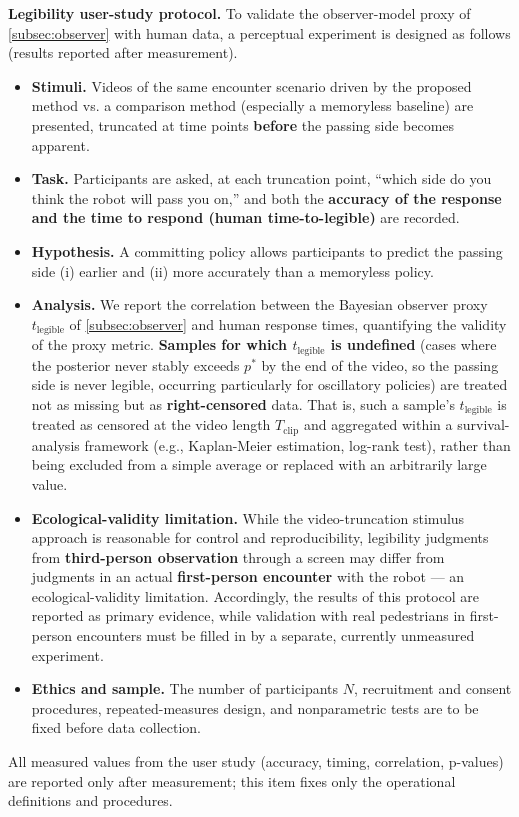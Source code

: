 \noindent\textbf{Legibility user-study protocol.} To validate the observer-model proxy of \cref{subsec:observer} with human data, a perceptual experiment is designed as follows (results reported after measurement).

\begin{itemize}
\item \textbf{Stimuli.} Videos of the same encounter scenario driven by the proposed method vs. a comparison method (especially a memoryless baseline) are presented, truncated at time points \textbf{before} the passing side becomes apparent.
\item \textbf{Task.} Participants are asked, at each truncation point, ``which side do you think the robot will pass you on,'' and both the \textbf{accuracy of the response and the time to respond (human time-to-legible)} are recorded.
\item \textbf{Hypothesis.} A committing policy allows participants to predict the passing side (i) earlier and (ii) more accurately than a memoryless policy.
\item \textbf{Analysis.} We report the correlation between the Bayesian observer proxy $t_{\text{legible}}$ of \cref{subsec:observer} and human response times, quantifying the validity of the proxy metric. \textbf{Samples for which $t_{\text{legible}}$ is undefined} (cases where the posterior never stably exceeds $p^*$ by the end of the video, so the passing side is never legible, occurring particularly for oscillatory policies) are treated not as missing but as \textbf{right-censored} data. That is, such a sample's $t_{\text{legible}}$ is treated as censored at the video length $T_{\text{clip}}$ and aggregated within a survival-analysis framework (e.g., Kaplan-Meier estimation, log-rank test), rather than being excluded from a simple average or replaced with an arbitrarily large value.
\item \textbf{Ecological-validity limitation.} While the video-truncation stimulus approach is reasonable for control and reproducibility, legibility judgments from \textbf{third-person observation} through a screen may differ from judgments in an actual \textbf{first-person encounter} with the robot --- an ecological-validity limitation. Accordingly, the results of this protocol are reported as primary evidence, while validation with real pedestrians in first-person encounters must be filled in by a separate, currently unmeasured experiment.
\item \textbf{Ethics and sample.} The number of participants $N$, recruitment and consent procedures, repeated-measures design, and nonparametric tests are to be fixed before data collection.
\end{itemize}

All measured values from the user study (accuracy, timing, correlation, p-values) are reported only after measurement; this item fixes only the operational definitions and procedures.
